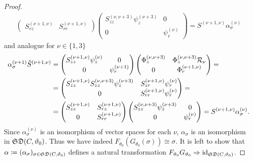 \begin{proof}
\begin{align*}
\begin{pmatrix}
             S_{rz}^{(\nu+1,\nu)} & S_{rr}^{(\nu+1,\nu)}
        \end{pmatrix} \begin{pmatrix}
            S_{zz}^{(\nu,\nu+3)}\psi_z^{(\nu+3)} &  0 \\
            0& \psi_r^{(\nu)}
        \end{pmatrix} = S^{(\nu+1,\nu)}\alpha_\sigma^{(\nu)}
\end{align*}
and analogue for $\nu \in \{1,3\}$ 
\begin{align*}
\alpha_\sigma^{(\nu+1)}\tilde{S}^{(\nu+1,\nu)} & = \begin{pmatrix}
    S_{zz}^{(\nu+1,\nu)}\psi_z^{(\nu)} & 0 \\
    0 & \psi_r^{(\nu+1)}
\end{pmatrix} \begin{pmatrix}
            \Phi^{(\nu,\nu+3)}_z & \Phi_z^{(\nu,\nu+3)} \mathcal{R}_\nu\\
            0 & \Phi_r^{(\nu+1,\nu)}
        \end{pmatrix} = \\
        & = \begin{pmatrix}
            S_{zz}^{(\nu+1,\nu)}S_{zz}^{(\nu,\nu+3)}\psi_z^{(\nu+3)} & S_{zr}^{(\nu+1,\nu)}\psi_r^{(\nu)} \\
            0 & S_{rr}^{(\nu+1,\nu)}\psi_r^{(\nu)}
        \end{pmatrix} = \\
        & = \begin{pmatrix}
            S_{zz}^{(\nu+1,\nu)} & S_{rz}^{(\nu+1,\nu)} \\
             0 & S_{rr}^{(\nu+1,\nu)}
        \end{pmatrix} \begin{pmatrix}
            S_{zz}^{(\nu,\nu+3)}\psi_z^{(\nu+3)} &  0 \\
            0& \psi_r^{(\nu)}
        \end{pmatrix} = S^{(\nu+1,\nu)}\alpha_\sigma^{(\nu)}.
\end{align*}
Since $\alpha_\sigma^{(\nu)}$ is an isomorphism of vector spaces for each $\nu$, $\alpha_\sigma$ is an isomorphism in $\mathfrak{SD}(C,\vartheta_0)$. Thus we have indeed $F_{\theta_0}(G_{\theta_0}(\sigma)) \cong \sigma$. It is left to show that $\alpha \coloneqq (\alpha_\sigma)_{\sigma \in \mathfrak{SD}(C,\vartheta_0)}$ defines a natural transformation $F_{\vartheta_0}G_{\vartheta_0} \Rightarrow \operatorname{id}_{\mathfrak{SD}(C,\vartheta_0)}$.


\end{proof}
